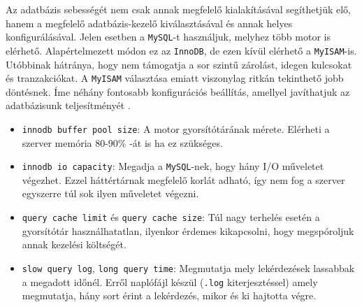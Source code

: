 Az adatbázis sebességét nem csak annak megfelelő kialakításával segíthetjük elő, hanem a megfelelő adatbázis-kezelő kiválasztásával és annak helyes konfigurálásával.
Jelen esetben a \texttt{MySQL}-t használjuk, melyhez több motor is elérhető. Alapértelmezett módon ez az \texttt{InnoDB}, de ezen kívül elérhető a \texttt{MyISAM}-is. Utóbbinak hátránya, hogy nem támogatja a sor szintű zárolást, idegen kulcsokat és tranzakciókat. A \texttt{MyISAM} választása emiatt viszonylag ritkán tekinthető jobb döntésnek. Íme néhány fontosabb konfigurációs beállítás, amellyel javíthatjuk az adatbázisunk teljesítményét \cite{other_optimization}.
\begin{itemize}
\item \texttt{innodb buffer pool size}: A motor gyorsítótárának mérete. Elérheti a szerver memória 80-90\% -át is ha ez szükséges.
\item \texttt{innodb io capacity}: Megadja a \texttt{MySQL}-nek, hogy hány I/O műveletet végezhet. Ezzel háttértárnak megfelelő korlát adható, így nem fog a szerver  egyszerre túl sok ilyen műveletet végezni.
\item \texttt{query cache limit} és \texttt{query cache size}: Túl nagy terhelés esetén a gyorsítótár használhatatlan, ilyenkor érdemes kikapcsolni, hogy megspóroljuk annak kezelési költségét.
\item \texttt{slow query log}, \texttt{long query time}: Megmutatja mely lekérdezések lassabbak a megadott időnél. Erről naplófájl készül (\texttt{.log} kiterjesztéssel) amely megmutatja, hány sort érint a lekérdezés, mikor és ki hajtotta végre.
\end{itemize}
